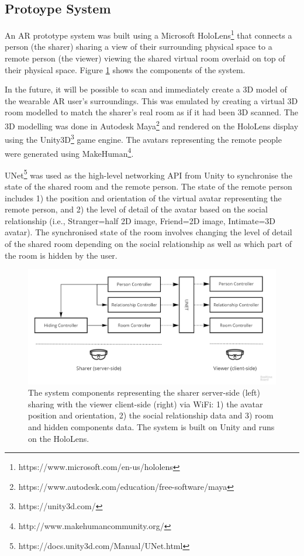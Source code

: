\subsection{Protoype System}

An AR prototype system was built using a Microsoft HoloLens\footnote{https://www.microsoft.com/en-us/hololens} that connects a person (the sharer) sharing a view of their surrounding physical space to a remote person (the viewer) viewing the shared virtual room overlaid on top of their physical space. Figure \ref{fig:frontier18:system} shows the components of the system.

In the future, it will be possible to scan and immediately create a 3D model of the wearable AR user's surroundings. This was emulated by creating a virtual 3D room modelled to match the sharer's real room as if it had been 3D scanned.  The 3D modelling was done in Autodesk Maya\footnote{https://www.autodesk.com/education/free-software/maya} and rendered on the HoloLens display using the Unity3D\footnote{https://unity3d.com/} game engine. The avatars representing the remote people were generated using MakeHuman\footnote{http://www.makehumancommunity.org/}.

UNet\footnote{https://docs.unity3d.com/Manual/UNet.html} was used as the high-level networking API from Unity to synchronise the state of the shared room and the remote person. The state of the remote person includes 1) the position and orientation of the virtual avatar representing the remote person, and 2) the level of detail of the avatar based on the social relationship (i.e., Stranger=half 2D image, Friend=2D image, Intimate=3D avatar). The synchronised state of the room involves changing the level of detail of the shared room depending on the social relationship as well as which part of the room is hidden by the user. 

\begin{figure}
\begin{center}
\includegraphics[width=\linewidth]{images/frontier18/system.jpg}
\caption{The system components representing the sharer server-side (left) sharing with the viewer client-side (right) via WiFi: 1) the avatar position and orientation, 2) the social relationship data and 3) room and hidden components data. The system is built on Unity and runs on the HoloLens.}\label{fig:frontier18:system}
\end{center}
\end{figure}

